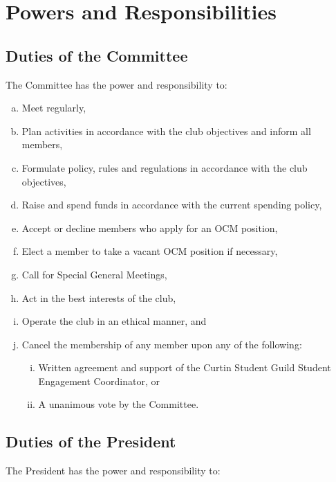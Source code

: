 \documentclass[a4paper,12pt]{article}
\begin{document}
\section{Powers and Responsibilities}

\subsection{Duties of the Committee}

The Committee has the power and responsibility to:

\begin{enumerate}[a)]
	\item Meet regularly,
	\item Plan activities in accordance with the club objectives and inform all members,
	\item Formulate policy, rules and regulations in accordance with the club objectives,
	\item Raise and spend funds in accordance with the current spending policy,
	\item Accept or decline members who apply for an OCM position,
	\item Elect a member to take a vacant OCM position if necessary,
	\item Call for Special General Meetings,
	\item Act in the best interests of the club,
	\item Operate the club in an ethical manner, and
	\item Cancel the membership of any member upon any of the following:
	\begin{enumerate}[i)]
		\item Written agreement and support of the Curtin Student Guild Student Engagement Coordinator, or
		\item A unanimous vote by the Committee.
	\end{enumerate}
\end{enumerate}

\subsection{Duties of the President}

The President has the power and responsibility to:
\end{document}
